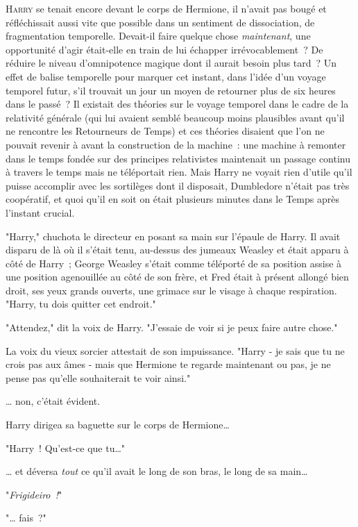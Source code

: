 
\lettrine{H}{arry} se tenait encore devant le corps de Hermione, il n'avait pas bougé et réfléchissait aussi vite que possible dans un sentiment de dissociation, de fragmentation temporelle. Devait-il faire quelque chose \emph{maintenant}, une opportunité d'agir était-elle en train de lui échapper irrévocablement~? De réduire le niveau d'omnipotence magique dont il aurait besoin plus tard~? Un effet de balise temporelle pour marquer cet instant, dans l'idée d'un voyage temporel futur, s'il trouvait un jour un moyen de retourner plus de six heures dans le passé~? Il existait des théories sur le voyage temporel dans le cadre de la relativité générale (qui lui avaient semblé beaucoup moins plausibles avant qu'il ne rencontre les Retourneurs de Temps) et ces théories disaient que l'on ne pouvait revenir à avant la construction de la machine~: une machine à remonter dans le temps fondée sur des principes relativistes maintenait un passage continu à travers le temps mais ne téléportait rien. Mais Harry ne voyait rien d'utile qu'il puisse accomplir avec les sortilèges dont il disposait, Dumbledore n'était pas très coopératif, et quoi qu'il en soit on était plusieurs minutes dans le Temps après l'instant crucial.

"Harry," chuchota le directeur en posant sa main sur l'épaule de Harry. Il avait disparu de là où il s'était tenu, au-dessus des jumeaux Weasley et était apparu à côté de Harry~; George Weasley s'était comme téléporté de sa position assise à une position agenouillée au côté de son frère, et Fred était à présent allongé bien droit, ses yeux grands ouverts, une grimace sur le visage à chaque respiration. "Harry, tu dois quitter cet endroit."

"Attendez," dit la voix de Harry. "J'essaie de voir si je peux faire autre chose."

La voix du vieux sorcier attestait de son impuissance. "Harry - je sais que tu ne crois pas aux âmes - mais que Hermione te regarde maintenant ou pas, je ne pense pas qu'elle souhaiterait te voir ainsi."

… non, c'était évident.

Harry dirigea sa baguette sur le corps de Hermione…

"Harry~! Qu'est-ce que tu…"

… et déversa \emph{tout} ce qu'il avait le long de son bras, le long de sa main…

"\emph{Frigideiro~!}"

"… fais~?"

